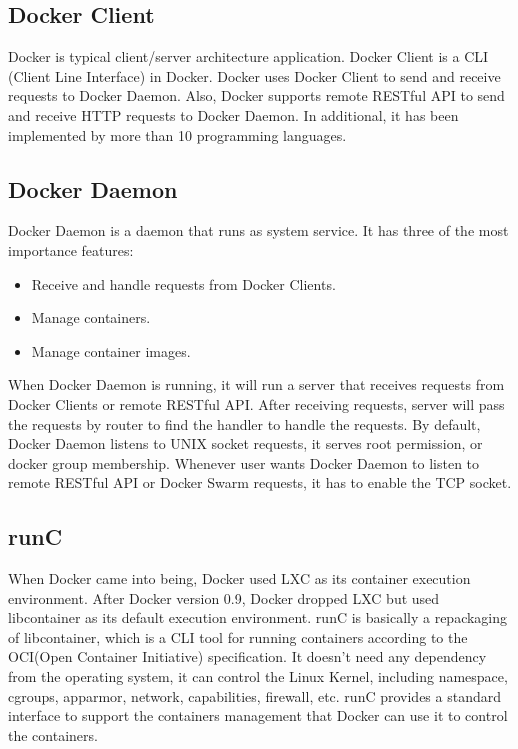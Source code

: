 \subsection{Docker Client}
Docker is typical client/server architecture application.
Docker Client is a \linebreak CLI (Client Line Interface) in Docker.
Docker uses Docker Client to send and receive requests to Docker Daemon. Also, Docker supports remote RESTful API to send and receive HTTP requests to Docker Daemon.
In additional, it has been implemented by more than 10 programming languages.

\subsection{Docker Daemon}
Docker Daemon is a daemon that runs as system service. It has three of the most importance features: 
\begin{itemize}
    \item Receive and handle requests from Docker Clients.
    \item Manage containers.
    \item Manage container images.
\end{itemize}
When Docker Daemon is running, it will run a server that receives requests from Docker Clients or remote RESTful API. After receiving requests, server will pass the requests by router to find the handler to handle the requests. By default, Docker Daemon listens to UNIX socket requests, it serves root permission, or docker group membership. Whenever user wants Docker Daemon to listen to remote RESTful API or Docker Swarm requests, it has to enable the TCP socket.

\subsection{runC}
When Docker came into being, Docker used LXC as its container execution environment. After Docker version 0.9, Docker dropped LXC but used libcontainer as its default execution environment.
runC is basically a repackaging of libcontainer, which is a CLI tool for running containers according to the OCI(Open Container Initiative) specification. It doesn't need any dependency from the operating system, it can control the Linux Kernel, including namespace, cgroups, apparmor, network, capabilities, firewall, etc.
runC provides a standard interface to support the containers management that Docker can use it to control the containers.

